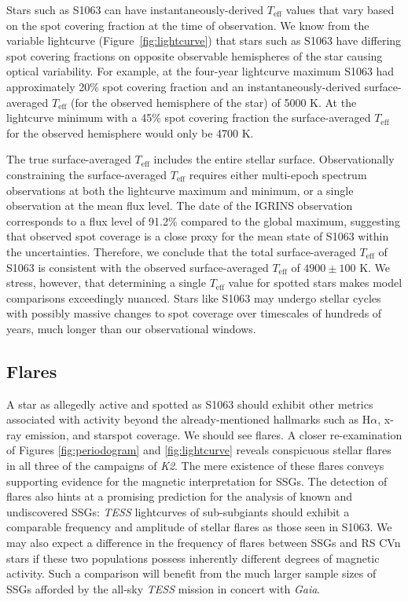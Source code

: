\documentclass[trackchanges]{aastex631}
\begin{document}
Stars such as S1063 can have instantaneously-derived $T_{\textrm{eff}}$ values that vary based on the spot covering fraction at the time of observation. We know from the variable lightcurve (Figure~\ref{fig:lightcurve}) that stars such as S1063 have differing spot covering fractions on opposite observable hemispheres of the star causing optical variability. For example, at the four-year lightcurve maximum S1063 had approximately 20\% spot covering fraction and an instantaneously-derived surface-averaged $T_{\textrm{eff}}$ (for the observed hemisphere of the star) of 5000 K. At the lightcurve minimum with a 45\% spot covering fraction the surface-averaged $T_{\textrm{eff}}$ for the observed hemisphere would only be 4700 K.

The true surface-averaged $T_{\textrm{eff}}$ includes the entire stellar surface. Observationally constraining the surface-averaged $T_{\textrm{eff}}$ requires either multi-epoch spectrum observations at both the lightcurve maximum and minimum, or a single observation at the mean flux level. The date of the IGRINS observation corresponds to a flux level of 91.2\% compared to the global maximum, suggesting that observed spot coverage is a close proxy for the mean state of S1063 within the uncertainties. Therefore, we conclude that the total surface-averaged $T_{\textrm{eff}}$ of S1063 is consistent with the observed surface-averaged $T_{\textrm{eff}}$ of $4900\pm100$ K. We stress, however, that determining a single $T_{\textrm{eff}}$ value for spotted stars makes model comparisons exceedingly nuanced.  Stars like S1063 may undergo stellar cycles with possibly massive changes to spot coverage over timescales of hundreds of years, much longer than our observational windows.

\subsection{Flares}

A star as allegedly active and spotted as S1063 should exhibit other metrics associated with activity beyond the already-mentioned hallmarks such as H$\alpha$, x-ray emission, and starspot coverage.  We should see flares.  A closer re-examination of Figures \ref{fig:periodogram} and \ref{fig:lightcurve} reveals conspicuous stellar flares in all three of the campaigns of \emph{K2}.  The mere existence of these flares conveys supporting evidence for the magnetic interpretation for SSGs.  The detection of flares also hints at a promising prediction for the analysis of known and undiscovered SSGs: \emph{TESS} lightcurves of sub-subgiants should exhibit a comparable frequency and amplitude of stellar flares as those seen in S1063.  We may also expect a difference in the frequency of flares between SSGs and RS CVn stars if these two populations possess inherently different degrees of magnetic activity.  Such a comparison will benefit from the much larger sample sizes of SSGs afforded by the all-sky \emph{TESS} mission in concert with \emph{Gaia}.
\end{document}
